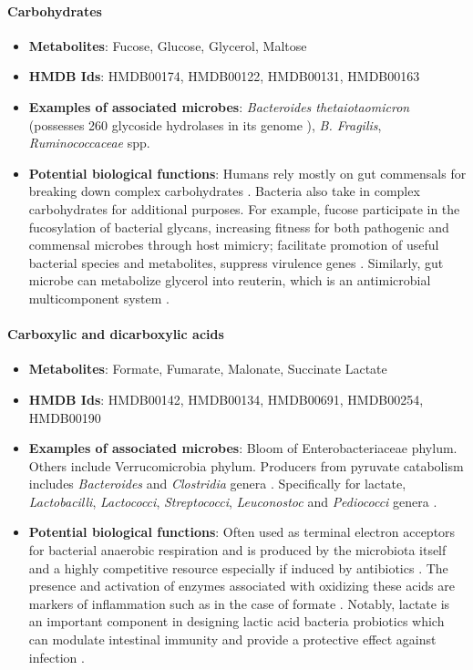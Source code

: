 \paragraph{Carbohydrates}  
\begin{itemize}
    \item \textbf{Metabolites}: Fucose, Glucose, Glycerol, Maltose 
    \item \textbf{HMDB Ids}: HMDB00174, HMDB00122, HMDB00131, HMDB00163 
    \item \textbf{Examples of associated microbes}: \emph{Bacteroides thetaiotaomicron} (possesses 260 glycoside hydrolases in its genome \cite{xu2003genomic}), \emph{B. Fragilis}, \emph{Ruminococcaceae} spp. 
    \item \textbf{Potential biological functions}: Humans rely mostly on gut commensals for breaking down complex carbohydrates \cite{oliphant2019macronutrient}. Bacteria also take in complex carbohydrates for additional purposes. For example, fucose participate in the fucosylation of bacterial glycans, increasing fitness for both pathogenic and commensal microbes through host mimicry; facilitate promotion of useful bacterial species and metabolites, suppress virulence genes \cite{pickard2015intestinal}. Similarly, gut microbe can metabolize glycerol into reuterin, which is an antimicrobial multicomponent system \cite{zhang2018gut}. 
\end{itemize}

\paragraph{Carboxylic and dicarboxylic acids}  
\begin{itemize}
    \item \textbf{Metabolites}: Formate, Fumarate, Malonate, Succinate Lactate 
    \item \textbf{HMDB Ids}: HMDB00142, HMDB00134, HMDB00691, HMDB00254, HMDB00190
    \item \textbf{Examples of associated microbes}: Bloom of Enterobacteriaceae phylum. Others include Verrucomicrobia phylum. Producers from pyruvate catabolism includes \emph{Bacteroides} and \emph{Clostridia} genera \cite{hughes2017microbial}. Specifically for lactate, \emph{Lactobacilli}, \emph{Lactococci}, \emph{Streptococci}, \emph{Leuconostoc} and \emph{Pediococci} genera \cite{pessione2012lactic}. 
    \item \textbf{Potential biological functions}: Often used as terminal electron acceptors for bacterial anaerobic respiration \cite{kroger1992bacterial} and is produced by the microbiota itself \cite{elaidy2013gut} and a highly competitive resource especially if induced by antibiotics \cite{reese2018antibioticinduced}. The presence and activation of enzymes associated with oxidizing these acids are markers of inflammation such as in the case of formate \cite{hughes2017microbial}. Notably, lactate is an important component in designing lactic acid bacteria probiotics which can modulate intestinal immunity and provide a protective effect against infection \cite{garrote2015lactate}. 
\end{itemize}


